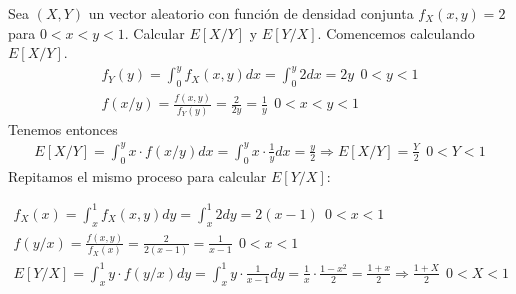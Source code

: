 \begin{ejercicio}
    Sea $(X,Y)$ un vector aleatorio con función de densidad conjunta $f_X(x,y)=2$ para $0<x<y<1$. Calcular $E[X/Y]$ y $E[Y/X]$.
    \endsquare
    Comencemos calculando $E[X/Y]$.
    \begin{gather*}
        f_Y(y) = \int_0^y f_X(x,y) dx = \int_0^y 2 dx = 2y \ \ 0<y<1\\
        f(x/y) = \frac{f(x,y)}{f_Y(y)} = \frac{2}{2y} = \frac{1}{y} \ \ 0<x<y<1
    \end{gather*}
    Tenemos entonces
    \begin{gather*}
        E[X/Y] = \int_0^y x \cdot f(x/y) dx = \int_0^y x \cdot \frac{1}{y} dx = \frac{y}{2} \Rightarrow E[X/Y] = \frac{Y}{2} \ \ 0<Y<1
    \end{gather*}
    Repitamos el mismo proceso para calcular $E[Y/X]$:

    \begin{gather*}
        f_X(x) = \int_x^1 f_X(x,y)dy = \int_x^1 2 dy = 2(x-1) \ \ 0<x<1\\
        f(y/x) = \frac{f(x,y)}{f_X(x)} = \frac{2}{2(x-1)} = \frac{1}{x-1} \ \ 0<x<1\\
        E[Y/X] = \int_x^1 y \cdot f(y/x) dy =  \int_x^1 y \cdot \frac{1}{x-1} dy= \frac{1}{x} \cdot \frac{1-x^2}{2} = \frac{1+x}{2} \Rightarrow \frac{1+X}{2}\ \ 0<X<1 
    \end{gather*}
\end{ejercicio}

